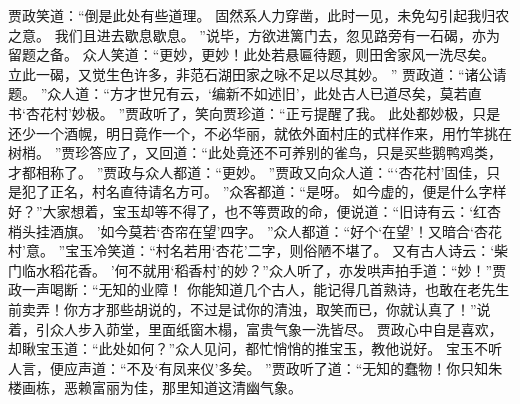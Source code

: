 \par
贾政笑道：“倒是此处有些道理。
固然系人力穿凿，此时一见，未免勾引起我归农之意。
我们且进去歇息歇息。
”说毕，方欲进篱门去，忽见路旁有一石碣，亦为留题之备。
众人笑道：“更妙，更妙！此处若悬匾待题，则田舍家风一洗尽矣。
立此一碣，又觉生色许多，非范石湖田家之咏不足以尽其妙。
”
贾政道：“诸公请题。
”众人道：“方才世兄有云，‘编新不如述旧’，此处古人已道尽矣，莫若直书‘杏花村’妙极。
”贾政听了，笑向贾珍道：“正亏提醒了我。
此处都妙极，只是还少一个酒幌，明日竟作一个，不必华丽，就依外面村庄的式样作来，用竹竿挑在树梢。
”贾珍答应了，又回道：“此处竟还不可养别的雀鸟，只是买些鹅鸭鸡类，才都相称了。
”贾政与众人都道：“更妙。
”贾政又向众人道：“‘杏花村’固佳，只是犯了正名，村名直待请名方可。
”众客都道：“是呀。
如今虚的，便是什么字样好？”大家想着，宝玉却等不得了，也不等贾政的命，便说道：“旧诗有云：‘红杏梢头挂酒旗。
’如今莫若‘杏帘在望’四字。
”众人都道：“好个‘在望’！又暗合‘杏花村’意。
”宝玉冷笑道：“村名若用‘杏花’二字，则俗陋不堪了。
又有古人诗云：‘柴门临水稻花香。
’何不就用‘稻香村’的妙？”众人听了，亦发哄声拍手道：“妙！”贾政一声喝断：“无知的业障！
你能知道几个古人，能记得几首熟诗，也敢在老先生前卖弄！你方才那些胡说的，不过是试你的清浊，取笑而已，你就认真了！”说着，引众人步入茆堂，里面纸窗木榻，富贵气象一洗皆尽。
贾政心中自是喜欢，却瞅宝玉道：“此处如何？”众人见问，都忙悄悄的推宝玉，教他说好。
宝玉不听人言，便应声道：“不及‘有凤来仪’多矣。
”贾政听了道：“无知的蠢物！你只知朱楼画栋，恶赖富丽为佳，那里知道这清幽气象。
